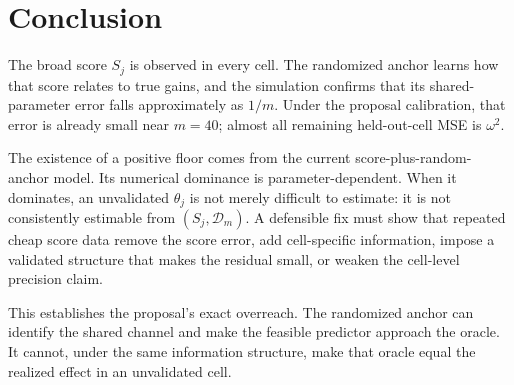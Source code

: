 \documentclass[11pt]{article}
\begin{document}
\section*{Conclusion}

The broad score \(S_j\) is observed in every cell. The randomized anchor
learns how that score relates to true gains, and the simulation confirms that
its shared-parameter error falls approximately as \(1/m\). Under the proposal
calibration, that error is already small near \(m=40\); almost all remaining
held-out-cell MSE is \(\omega^2\).

The existence of a positive floor comes from the current score-plus-random-
anchor model. Its numerical dominance is parameter-dependent. When it
dominates, an unvalidated \(\theta_j\) is not merely difficult to estimate:
it is not consistently estimable from \((S_j,\mathcal D_m)\). A defensible
fix must show that repeated cheap score data remove the score error, add
cell-specific information, impose a validated structure that makes the
residual small, or weaken the cell-level precision claim.

This establishes the proposal's exact overreach. The randomized anchor can
identify the shared channel and make the feasible predictor approach the
oracle. It cannot, under the same information structure, make that oracle
equal the realized effect in an unvalidated cell.
\end{document}
